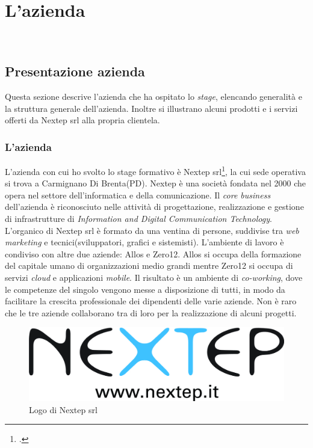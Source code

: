 
\chapter{L'azienda}
\label{cap:azienda}
\\




\section{Presentazione azienda}
Questa sezione descrive l'azienda che ha ospitato lo \emph{stage}, elencando generalità e la struttura generale dell'azienda. Inoltre si illustrano alcuni prodotti e i servizi offerti da Nextep srl alla propria clientela.

\subsection{L'azienda}
L'azienda con cui ho svolto lo stage formativo è Nextep srl\footcite{http://www.nextep.it/}, la cui sede operativa si trova a Carmignano Di Brenta(PD). Nextep è una società fondata nel 2000 che opera nel settore dell'informatica e della comunicazione. Il \emph{core business} dell'azienda è riconosciuto nelle attività di progettazione, realizzazione e gestione di infrastrutture di \emph{Information and Digital Communication Technology}. L'organico di Nextep srl è formato da una ventina di persone, suddivise tra \emph{web marketing} e tecnici(sviluppatori, grafici e sistemisti). L'ambiente di lavoro è condiviso con altre due aziende: Allos  e Zero12. Allos si occupa della formazione del capitale umano di organizzazioni medio grandi mentre Zero12  si occupa di servizi \emph{cloud} e applicazioni \emph{mobile}. Il risultato è un ambiente di \emph{co-working}, dove le competenze del singolo vengono messe a disposizione di tutti, in modo da facilitare la crescita professionale dei dipendenti delle varie aziende. Non è raro che le tre aziende collaborano tra di loro per la realizzazione di alcuni progetti.
\begin{figure}[h]
\centering
\includegraphics[scale=0.20]{immagini/logo_nextep}
\caption{Logo di Nextep srl}
\label{fig:logo_nextep}
\end{figure}

